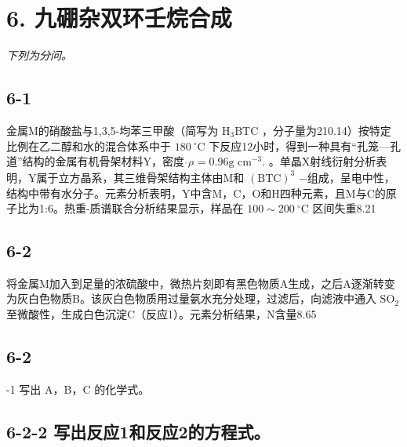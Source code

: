 \section*{6. 九硼杂双环壬烷合成}
\textit{下列为分问。}

\subsection*{6-1}
⾦属M的硝酸盐与1,3,5-均苯三甲酸（简写为 $\mathrm { H _ { 3 } B T C }$ ，分⼦量为210.14）按特定⽐例在⼄⼆醇和⽔的混合体系中于 $1 8 0 ~ ^ { \circ } \mathrm { C }$ 下反应12⼩时，得到⼀种具有“孔笼—孔道”结构的⾦属有机⻣架材料Y，密度 $\dot { } \rho _ { } = 0 . 9 6 \mathrm { g }$ $\mathrm { c m } ^ { - 3 } .$ 。单晶X射线衍射分析表明，Y属于⽴⽅晶系，其三维⻣架结构主体由M和 $\mathrm { ( B T C ) ^ { 3 } }$ −组成，呈电中性，结构中带有⽔分⼦。元素分析表明，Y中含M，C，O和H四种元素，且M与C的原⼦⽐为1:6。热重-质谱联合分析结果显⽰，样品在 $1 0 0 { \sim } 2 0 0 \ ^ { \circ } \mathrm { C }$ 区间失重8.21%

\subsection*{6-2}
将⾦属M加⼊到⾜量的浓硫酸中，微热⽚刻即有⿊⾊物质A⽣成，之后A逐渐转变为灰⽩⾊物质B。该灰⽩⾊物质⽤过量氨⽔充分处理，过滤后，向滤液中通⼊ $\mathrm { S O _ { 2 } }$ ⾄微酸性，⽣成⽩⾊沉淀C（反应1）。元素分析结果，N含量8.65 %

\subsection*{6-2}
-1 写出 A，B，C 的化学式。

\subsection*{6-2-2 写出反应1和反应2的⽅程式。}
